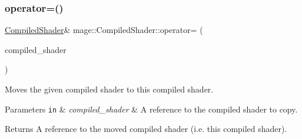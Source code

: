 \subsubsection{\texorpdfstring{operator=()}{operator=()}\hspace{0.1cm}{\footnotesize\ttfamily [2/2]}}
{\footnotesize\ttfamily \hyperlink{structmage_1_1_compiled_shader}{Compiled\+Shader}\& mage\+::\+Compiled\+Shader\+::operator= (\begin{DoxyParamCaption}\item[{\hyperlink{structmage_1_1_compiled_shader}{Compiled\+Shader} \&\&}]{compiled\+\_\+shader }\end{DoxyParamCaption})\hspace{0.3cm}{\ttfamily [delete]}}

Moves the given compiled shader to this compiled shader.


\begin{DoxyParams}[1]{Parameters}
\mbox{\tt in}  & {\em compiled\+\_\+shader} & A reference to the compiled shader to copy. \\
\hline
\end{DoxyParams}
\begin{DoxyReturn}{Returns}
A reference to the moved compiled shader (i.\+e. this compiled shader). 
\end{DoxyReturn}
